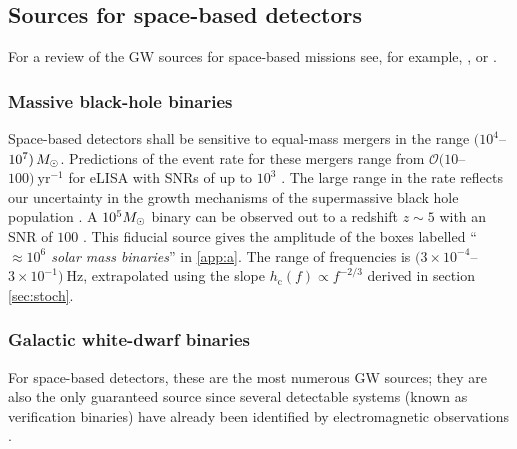 \subsection{Sources for space-based detectors}

For a review of the GW sources for space-based missions see, for example, \citet{Amaro-Seoane-et-al}, \citet{Gairetal} or \citet{eLISAyellowbook}.

\subsubsection{Massive black-hole binaries}

Space-based detectors shall be sensitive to equal-mass mergers in the range $(10^{4}$--$10^{7})\,M_{ \odot }$. Predictions of the event rate for these mergers range from ${\mathcal{O}}(10$--$100)~\mathrm{yr}^{-1}$ for eLISA with SNRs of up to $10^3$ \citep{TheGravitationalUniverse}. The large range in the rate reflects our uncertainty in the growth mechanisms of the supermassive black hole population \citep{Volonteri2010}. A $10^5 M_{ \odot }$ binary can be observed out to a redshift $z \sim 5$ with an SNR of $100$ \citep{TheGravitationalUniverse}. This fiducial source gives the amplitude of the boxes labelled ``\emph{$\mathit{\approx 10^{6}}$ solar mass binaries}'' in \ref{app:a}. The range of frequencies is $(3\times 10^{-4}$--$3\times 10^{-1})~\mathrm{Hz}$, extrapolated using the slope $h_\mathrm{c}(f) \propto f^{-2/3}$ derived in section \ref{sec:stoch}.


\subsubsection{Galactic white-dwarf binaries} \label{sec:GB}

For space-based detectors, these are the most numerous GW sources; they are also the only guaranteed source since several detectable systems (known as verification binaries) have already been identified by electromagnetic observations \citep{2006CQGra..23S.809S}.

